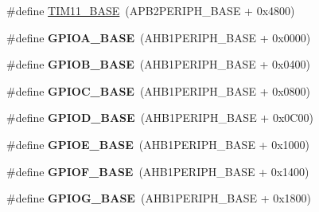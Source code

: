 \begin{DoxyCompactItemize}
\item 
\#define \hyperlink{group___peripheral__memory__map_ga3a4a06bb84c703084f0509e105ffaf1d}{T\-I\-M11\-\_\-\-B\-A\-S\-E}~(A\-P\-B2\-P\-E\-R\-I\-P\-H\-\_\-\-B\-A\-S\-E + 0x4800)
\item 
\hypertarget{group___peripheral__memory__map_gad7723846cc5db8e43a44d78cf21f6efa}{\#define {\bfseries G\-P\-I\-O\-A\-\_\-\-B\-A\-S\-E}~(A\-H\-B1\-P\-E\-R\-I\-P\-H\-\_\-\-B\-A\-S\-E + 0x0000)}\label{group___peripheral__memory__map_gad7723846cc5db8e43a44d78cf21f6efa}

\item 
\hypertarget{group___peripheral__memory__map_gac944a89eb789000ece920c0f89cb6a68}{\#define {\bfseries G\-P\-I\-O\-B\-\_\-\-B\-A\-S\-E}~(A\-H\-B1\-P\-E\-R\-I\-P\-H\-\_\-\-B\-A\-S\-E + 0x0400)}\label{group___peripheral__memory__map_gac944a89eb789000ece920c0f89cb6a68}

\item 
\hypertarget{group___peripheral__memory__map_ga26f267dc35338eef219544c51f1e6b3f}{\#define {\bfseries G\-P\-I\-O\-C\-\_\-\-B\-A\-S\-E}~(A\-H\-B1\-P\-E\-R\-I\-P\-H\-\_\-\-B\-A\-S\-E + 0x0800)}\label{group___peripheral__memory__map_ga26f267dc35338eef219544c51f1e6b3f}

\item 
\hypertarget{group___peripheral__memory__map_ga1a93ab27129f04064089616910c296ec}{\#define {\bfseries G\-P\-I\-O\-D\-\_\-\-B\-A\-S\-E}~(A\-H\-B1\-P\-E\-R\-I\-P\-H\-\_\-\-B\-A\-S\-E + 0x0\-C00)}\label{group___peripheral__memory__map_ga1a93ab27129f04064089616910c296ec}

\item 
\hypertarget{group___peripheral__memory__map_gab487b1983d936c4fee3e9e88b95aad9d}{\#define {\bfseries G\-P\-I\-O\-E\-\_\-\-B\-A\-S\-E}~(A\-H\-B1\-P\-E\-R\-I\-P\-H\-\_\-\-B\-A\-S\-E + 0x1000)}\label{group___peripheral__memory__map_gab487b1983d936c4fee3e9e88b95aad9d}

\item 
\hypertarget{group___peripheral__memory__map_ga7f9a3f4223a1a784af464a114978d26e}{\#define {\bfseries G\-P\-I\-O\-F\-\_\-\-B\-A\-S\-E}~(A\-H\-B1\-P\-E\-R\-I\-P\-H\-\_\-\-B\-A\-S\-E + 0x1400)}\label{group___peripheral__memory__map_ga7f9a3f4223a1a784af464a114978d26e}

\item 
\hypertarget{group___peripheral__memory__map_ga5d8ca4020f2e8c00bde974e8e7c13cfe}{\#define {\bfseries G\-P\-I\-O\-G\-\_\-\-B\-A\-S\-E}~(A\-H\-B1\-P\-E\-R\-I\-P\-H\-\_\-\-B\-A\-S\-E + 0x1800)}\label{group___peripheral__memory__map_ga5d8ca4020f2e8c00bde974e8e7c13cfe}


\end{DoxyCompactItemize}
